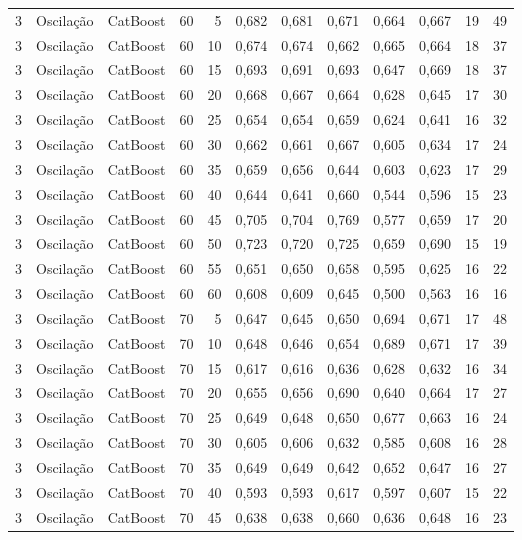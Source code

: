 \begin{longtable}{@{}rllrrrrrrrrr@{}}
3 & Oscilação & CatBoost & 60 & 5 & 0,682 & 0,681 & 0,671 & 0,664 & 0,667 & 19 & 49 \\
3 & Oscilação & CatBoost & 60 & 10 & 0,674 & 0,674 & 0,662 & 0,665 & 0,664 & 18 & 37 \\
3 & Oscilação & CatBoost & 60 & 15 & 0,693 & 0,691 & 0,693 & 0,647 & 0,669 & 18 & 37 \\
3 & Oscilação & CatBoost & 60 & 20 & 0,668 & 0,667 & 0,664 & 0,628 & 0,645 & 17 & 30 \\
3 & Oscilação & CatBoost & 60 & 25 & 0,654 & 0,654 & 0,659 & 0,624 & 0,641 & 16 & 32 \\
3 & Oscilação & CatBoost & 60 & 30 & 0,662 & 0,661 & 0,667 & 0,605 & 0,634 & 17 & 24 \\
3 & Oscilação & CatBoost & 60 & 35 & 0,659 & 0,656 & 0,644 & 0,603 & 0,623 & 17 & 29 \\
3 & Oscilação & CatBoost & 60 & 40 & 0,644 & 0,641 & 0,660 & 0,544 & 0,596 & 15 & 23 \\
3 & Oscilação & CatBoost & 60 & 45 & 0,705 & 0,704 & 0,769 & 0,577 & 0,659 & 17 & 20 \\
3 & Oscilação & CatBoost & 60 & 50 & 0,723 & 0,720 & 0,725 & 0,659 & 0,690 & 15 & 19 \\
3 & Oscilação & CatBoost & 60 & 55 & 0,651 & 0,650 & 0,658 & 0,595 & 0,625 & 16 & 22 \\
3 & Oscilação & CatBoost & 60 & 60 & 0,608 & 0,609 & 0,645 & 0,500 & 0,563 & 16 & 16 \\
3 & Oscilação & CatBoost & 70 & 5 & 0,647 & 0,645 & 0,650 & 0,694 & 0,671 & 17 & 48 \\
3 & Oscilação & CatBoost & 70 & 10 & 0,648 & 0,646 & 0,654 & 0,689 & 0,671 & 17 & 39 \\
3 & Oscilação & CatBoost & 70 & 15 & 0,617 & 0,616 & 0,636 & 0,628 & 0,632 & 16 & 34 \\
3 & Oscilação & CatBoost & 70 & 20 & 0,655 & 0,656 & 0,690 & 0,640 & 0,664 & 17 & 27 \\
3 & Oscilação & CatBoost & 70 & 25 & 0,649 & 0,648 & 0,650 & 0,677 & 0,663 & 16 & 24 \\
3 & Oscilação & CatBoost & 70 & 30 & 0,605 & 0,606 & 0,632 & 0,585 & 0,608 & 16 & 28 \\
3 & Oscilação & CatBoost & 70 & 35 & 0,649 & 0,649 & 0,642 & 0,652 & 0,647 & 16 & 27 \\
3 & Oscilação & CatBoost & 70 & 40 & 0,593 & 0,593 & 0,617 & 0,597 & 0,607 & 15 & 22 \\
3 & Oscilação & CatBoost & 70 & 45 & 0,638 & 0,638 & 0,660 & 0,636 & 0,648 & 16 & 23 \\

\end{longtable}
